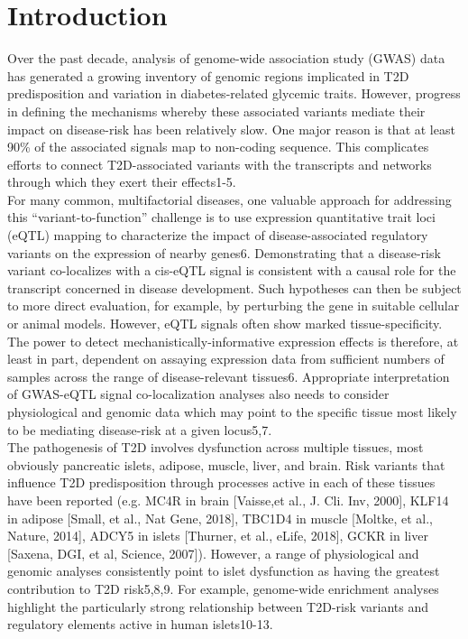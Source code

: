\section{Introduction}
Over the past decade, analysis of genome-wide association study (GWAS) data has generated a growing inventory of genomic regions implicated in T2D predisposition and variation in diabetes-related glycemic traits. However, progress in defining the mechanisms whereby these associated variants mediate their impact on disease-risk has been relatively slow. One major reason is that at least 90\% of the associated signals map to non-coding sequence. This complicates efforts to connect T2D-associated variants with the transcripts and networks through which they exert their effects1-5. \\
    
For many common, multifactorial diseases, one valuable approach for addressing this “variant-to-function” challenge is to use expression quantitative trait loci (eQTL) mapping to characterize the impact of disease-associated regulatory variants on the expression of nearby genes6. Demonstrating that a disease-risk variant co-localizes with a cis-eQTL signal is consistent with a causal role for the transcript concerned in disease development. Such hypotheses can then be subject to more direct evaluation, for example, by perturbing the gene in suitable cellular or animal models. However, eQTL signals often show marked tissue-specificity. The power to detect mechanistically-informative expression effects is therefore, at least in part, dependent on assaying expression data from sufficient numbers of samples across the range of disease-relevant tissues6. Appropriate interpretation of GWAS-eQTL signal co-localization analyses also needs to consider physiological and genomic data which may point to the specific tissue most likely to be mediating disease-risk at a given locus5,7. \\
    
The pathogenesis of T2D involves dysfunction across multiple tissues, most obviously pancreatic islets, adipose, muscle, liver, and brain. Risk variants that influence T2D predisposition through processes active in each of these tissues have been reported (e.g. MC4R in brain [Vaisse,et al., J. Cli. Inv, 2000], KLF14 in adipose [Small, et al., Nat Gene, 2018], TBC1D4 in muscle [Moltke, et al., Nature, 2014], ADCY5 in islets [Thurner, et al.,  eLife, 2018], GCKR in liver [Saxena, DGI, et al, Science, 2007]). However, a range of physiological and genomic analyses consistently point to islet dysfunction as having the greatest contribution to T2D risk5,8,9. For example, genome-wide enrichment analyses highlight the particularly strong relationship between T2D-risk variants and regulatory elements active in human islets10-13. \\
    
